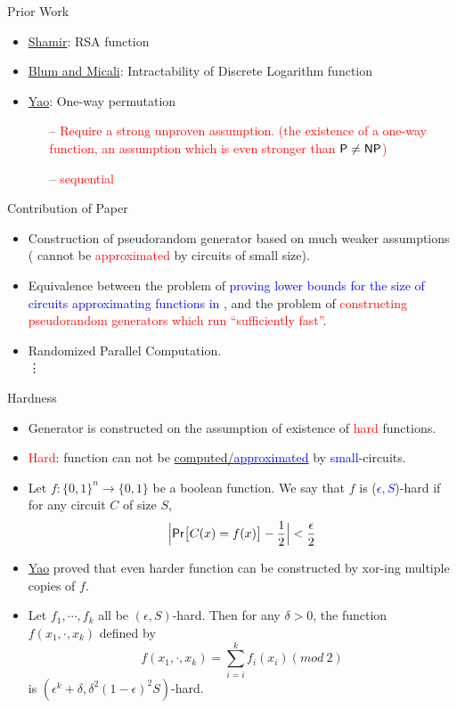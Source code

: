 \documentclass[xcolor={table,dvipsnames,usenames}]{beamer}
\begin{document}
\begin{frame}{Prior Work}
\begin{itemize}
	\item \href{https://link.springer.com/chapter/10.1007/3-540-10843-2_43}{Shamir}: RSA function
	\item  \href{https://dl.acm.org/citation.cfm?id=2068}{Blum and Micali}: Intractability of Discrete Logarithm function
	\item \href{https://ieeexplore.ieee.org/document/4568378}{Yao}: One-way permutation
	\pause
	\begin{itemize}
		\item[--] \textcolor{red}{Require a strong unproven assumption. (the existence of a one-way function, an assumption which is even stronger than $ \mathsf{P} \neq \mathsf{NP}$)}
		\item[--] \textcolor{red}{sequential}
	\end{itemize}
\end{itemize}
\end{frame}
\begin{frame}{Contribution of Paper}
\begin{itemize}
	\item Construction of pseudorandom generator based on much weaker assumptions ({\EXPTIME} cannot be \textcolor{red}{approximated} by circuits of small size).
	\pause
	\item Equivalence between the problem of \textcolor{blue}{proving lower bounds for the size of circuits approximating functions in {\EXPTIME}}, and the problem of \textcolor{red}{constructing pseudorandom generators which run ``sufficiently fast''}.
	\pause
	\item Randomized Parallel Computation.\\
	\pause
	\quad \quad \vdots
\end{itemize}
\end{frame}
\begin{frame}{Hardness}
\begin{itemize}
	\item Generator is constructed on the assumption of existence of \textcolor{red}{hard} functions.
	\pause
	\item \textcolor{red}{Hard}: function can not be \underline{computed/\textcolor{blue}{approximated}} by \textcolor{blue}{small}-circuits.
	\pause
	\item  Let $f:\{0,1\}^n \rightarrow \{0, 1\}$ be a boolean function. We say that $f$ is (\textcolor{blue}{$\epsilon,S$})-hard if for any circuit $C$ of size $S$,
	$$\Big|\mathsf{Pr}\big[C(x)=f(x)\big]- \frac{1}{2}\Big| < \frac{\epsilon}{2}$$
	\pause
	\item \href{https://ieeexplore.ieee.org/document/4568378/}{Yao} proved that even harder function can be constructed by xor-ing multiple copies of $f$.
	\pause
	\item Let $f_1, \cdots, f_k$ all be $(\epsilon,S)$-hard. Then for any $\delta>0$, the function $f(x_1, \cdot, x_k)$ defined by
	$$f(x_1, \cdot, x_k)= \sum_{i = i}^{k} f_i(x_i) (mod~2)$$
	is  $(\epsilon^k + \delta, \delta^2(1-\epsilon)^2S)$-hard.
\end{itemize}
\end{frame}
\end{document}
